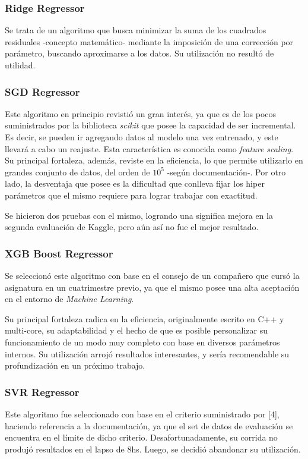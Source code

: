 \documentclass[titlepage,a4paper,11pt]{article}
\begin{document}
\subsubsection{Ridge Regressor}
Se trata de un algoritmo que busca minimizar la suma de los cuadrados residuales -concepto matemático- mediante la imposición de una corrección por parámetro, buscando aproximarse a los datos. Su utilización no resultó de utilidad.

\subsubsection{SGD Regressor}
Este algoritmo en principio revistió un gran interés, ya que es de los pocos suministrados por la biblioteca \textit{scikit} que posee la capacidad de ser incremental. Es decir, se pueden ir agregando datos al modelo una vez entrenado, y este llevará a cabo un reajuste. Esta característica es conocida como \textit{feature scaling}. Su principal fortaleza, además, reviste en la eficiencia, lo que permite utilizarlo en grandes conjunto de datos, del orden de $10^{5}$ -según documentación-. Por otro lado, la desventaja que posee es la dificultad que conlleva fijar los hiper parámetros que el mismo requiere para lograr trabajar con exactitud.

Se hicieron dos pruebas con el mismo, logrando una significa mejora en la segunda evaluación de Kaggle, pero aún así no fue el mejor resultado.
\subsubsection{XGB Boost Regressor}
Se seleccionó este algoritmo con base en el consejo de un compañero que cursó la asignatura en un cuatrimestre previo, ya que el mismo posee una alta aceptación en el entorno de \textit{Machine Learning}.

Su principal fortaleza radica en la eficiencia, originalmente escrito en C++ y multi-core, su adaptabilidad y el hecho de que es posible personalizar su funcionamiento de un modo muy completo con base en diversos parámetros internos. Su utilización arrojó resultados interesantes, y sería recomendable su profundización en un próximo trabajo.
\subsubsection{SVR Regressor}

Este algoritmo fue seleccionado con base en el criterio suministrado por [4], haciendo referencia a la documentación, ya que el set de datos de evaluación se encuentra en el límite de dicho criterio. Desafortunadamente, su corrida no produjó resultados en el lapso de 8hs. Luego, se decidió abandonar su utilización.
\end{document}
